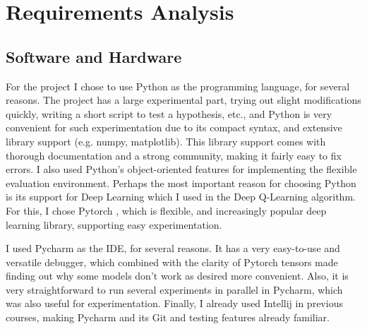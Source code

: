 \section{Requirements Analysis}





\subsection{Software and Hardware}


For the project I chose to use Python as the programming language, for several reasons. The project has a large experimental part, trying out slight modifications quickly, writing a short script to test a hypothesis, etc., and Python is very convenient for such experimentation due to its compact syntax, and extensive library support (e.g. numpy, matplotlib). This library support comes with thorough documentation and a strong community, making it fairly easy to fix errors. I also used Python's object-oriented features for implementing the flexible evaluation environment. Perhaps the most important reason for choosing Python is its support for Deep Learning which I used in the Deep Q-Learning algorithm. For this, I chose Pytorch \cite{ketkar2021pytorch}, which is flexible, and increasingly popular deep learning library, supporting easy experimentation.


I used Pycharm as the IDE, for several reasons. It has a very easy-to-use and versatile debugger, which combined with the clarity of Pytorch tensors made finding out why some models don't work as desired more convenient. Also, it is very straightforward to run several experiments in parallel in Pycharm, which was also useful for experimentation. Finally, I already used Intellij in previous courses, making Pycharm and its Git and testing features already familiar.

